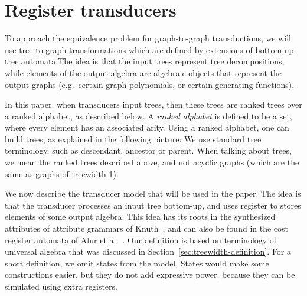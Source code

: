 \section{Register transducers}\label{sec:register-transducers}
To approach the equivalence problem for graph-to-graph transductions, we will use tree-to-graph transformations which are defined by extensions of bottom-up tree automata.The idea is that the input trees represent tree decompositions, while elements of the output algebra are algebraic objects that represent the output graphs (e.g.~certain graph polynomials, or certain generating functions). 

In this paper, when transducers input trees, then these trees are  ranked trees over a ranked alphabet, as described below. A \emph{ranked alphabet} is defined to be  a set, where every element has an associated arity. Using a ranked alphabet, one can build trees, as explained in the following picture:
We use standard tree terminology, such as descendant, ancestor or parent. When talking about trees, we mean the ranked trees described above, and not acyclic graphs (which are the same as graphs of treewidth 1). 

We now describe the transducer model that will be used in the paper. The idea is that the transducer processes an input tree bottom-up, and uses register to stores elements of some output algebra.  This idea has its roots in the synthesized attributes of attribute grammars of Knuth~\cite{Knuth:1968aa}, and can also be found in the cost register automata of Alur et al.~\cite[p.~15]{alurDantoniDeshmukhYuan2013}. Our definition is based on  terminology of universal algebra that was discussed in Section~\ref{sec:treewidth-definition}.
For a short definition, we omit states from the model.  States would make some constructions easier, but they do not add expressive power, because they  can be simulated using extra registers.


